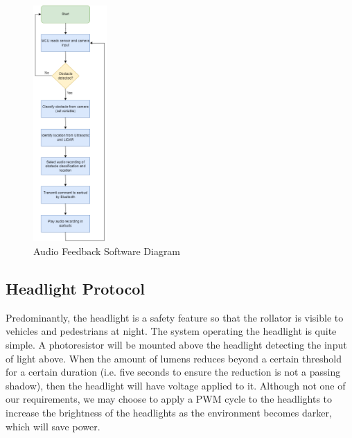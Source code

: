 \begin{figure}[H]
	\centering
	\includegraphics[width=0.25\textwidth]{./Images/audio2.drawio.png}
	\caption{\label{fig:audiosw}Audio Feedback Software Diagram}
\end{figure}

\subsection{Headlight Protocol}
\noindent  Predominantly, the headlight is a safety feature so that the rollator is visible to vehicles and pedestrians at night. The system operating the headlight is quite simple. A photoresistor will be mounted above the headlight detecting the input of light above. When the amount of lumens reduces beyond a certain threshold for a certain duration (i.e. five seconds to ensure the reduction is not a passing shadow), then the headlight will have voltage applied to it. Although not one of our requirements, we may choose to apply a PWM cycle to the headlights to increase the brightness of the headlights as the environment becomes darker, which will save power.\\